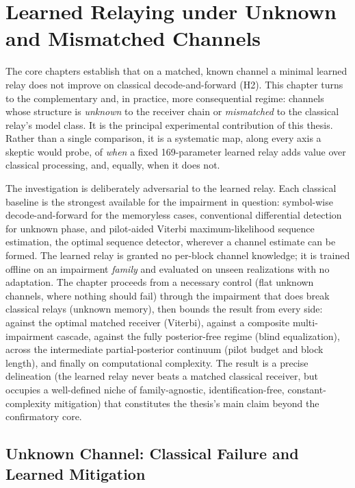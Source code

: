 \chapter{Learned Relaying under Unknown and Mismatched Channels}\label{sec:unknown-channels}

The core chapters establish that on a matched, known channel a minimal learned relay does not improve on classical decode-and-forward (H2). This chapter turns to the complementary and, in practice, more consequential regime: channels whose structure is \emph{unknown} to the receiver chain or \emph{mismatched} to the classical relay's model class. It is the principal experimental contribution of this thesis. Rather than a single comparison, it is a systematic map, along every axis a skeptic would probe, of \emph{when} a fixed 169-parameter learned relay adds value over classical processing, and, equally, when it does not.

The investigation is deliberately adversarial to the learned relay. Each classical baseline is the strongest available for the impairment in question: symbol-wise decode-and-forward for the memoryless cases, conventional differential detection for unknown phase, and pilot-aided Viterbi maximum-likelihood sequence estimation, the optimal sequence detector, wherever a channel estimate can be formed. The learned relay is granted no per-block channel knowledge; it is trained offline on an impairment \emph{family} and evaluated on unseen realizations with no adaptation. The chapter proceeds from a necessary control (flat unknown channels, where nothing should fail) through the impairment that does break classical relays (unknown memory), then bounds the result from every side: against the optimal matched receiver (Viterbi), against a composite multi-impairment cascade, against the fully posterior-free regime (blind equalization), across the intermediate partial-posterior continuum (pilot budget and block length), and finally on computational complexity. The result is a precise delineation (the learned relay never beats a matched classical receiver, but occupies a well-defined niche of family-agnostic, identification-free, constant-complexity mitigation) that constitutes the thesis's main claim beyond the confirmatory core.

\section{Unknown Channel: Classical Failure and Learned Mitigation}\label{sec:unknown-channel-experiment}


